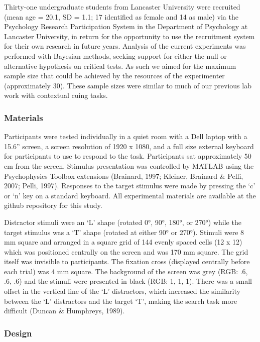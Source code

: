 \documentclass[
  man,
  floatsintext,
  longtable,
  nolmodern,
  notxfonts,
  notimes,
  colorlinks=true,linkcolor=blue,citecolor=blue,urlcolor=blue]{apa7}
\begin{document}
Thirty-one undergraduate students from Lancaster University were
recruited (mean age = 20.1, SD = 1.1; 17 identified as female and 14 as
male) via the Psychology Research Participation System in the Department
of Psychology at Lancaster University, in return for the opportunity to
use the recruitment system for their own research in future years.
Analysis of the current experiments was performed with Bayesian methods,
seeking support for either the null or alternative hypothesis on
critical tests. As such we aimed for the maximum sample size that could
be achieved by the resources of the experimenter (approximately 30).
These sample sizes were similar to much of our previous lab work with
contextual cuing tasks.

\subsubsection{Materials}\label{materials}

Participants were tested individually in a quiet room with a Dell laptop
with a 15.6'' screen, a screen resolution of 1920 x 1080, and a full
size external keyboard for participants to use to respond to the task.
Participants sat approximately 50 cm from the screen. Stimulus
presentation was controlled by MATLAB using the Psychophysics Toolbox
extensions (Brainard, 1997; Kleiner, Brainard \& Pelli, 2007; Pelli,
1997). Responses to the target stimulus were made by pressing the `c' or
`n' key on a standard keyboard. All experimental materials are available
at the github repository for this study.

Distractor stimuli were an `L' shape (rotated 0°, 90°, 180°, or 270°)
while the target stimulus was a `T' shape (rotated at either 90° or
270°). Stimuli were 8 mm square and arranged in a square grid of 144
evenly spaced cells (12 x 12) which was positioned centrally on the
screen and was 170 mm square. The grid itself was invisible to
participants. The fixation cross (displayed centrally before each trial)
was 4 mm square. The background of the screen was grey (RGB: .6, .6, .6)
and the stimuli were presented in black (RGB: 1, 1, 1). There was a
small offset in the vertical line of the `L' distractors, which
increased the similarity between the `L' distractors and the target `T',
making the search task more difficult (Duncan \& Humphreys, 1989).

\subsubsection{Design}\label{design}
\end{document}

